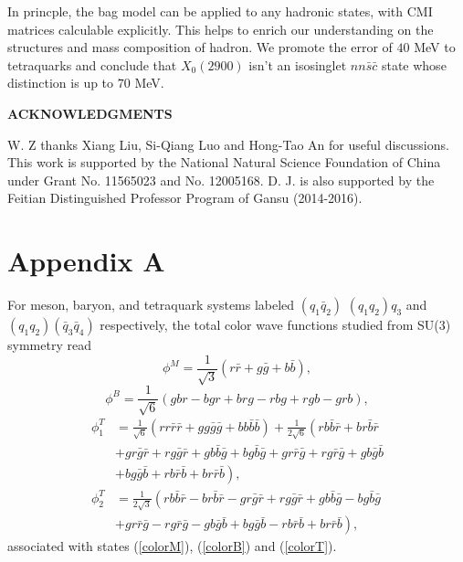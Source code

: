 \documentclass[prd,twocolumn,floatfix,nofootinbib]{revtex4}
\begin{document}
In princple, the bag model can be applied to any hadronic states, with CMI matrices calculable explicitly. This helps to enrich our understanding on the structures and mass composition of hadron. 
We promote the error of $40$ MeV to tetraquarks and conclude that $X_{0}(2900)$ isn't an isosinglet $nn\bar{s}\bar{c}$ state whose distinction is up to $70$ MeV. 


\medskip
\textbf{ACKNOWLEDGMENTS}

W. Z thanks Xiang Liu, Si-Qiang Luo and Hong-Tao An for useful discussions.
This work is supported by the National Natural Science Foundation of China under Grant No. 11565023 and No. 12005168. 
D. J. is also supported by the Feitian Distinguished Professor Program of Gansu (2014-2016).


\medskip
\section*{Appendix A}\label{AppendixA}
\setcounter{equation}{0}
\renewcommand{\theequation}{A\arabic{equation}}
For meson, baryon, and tetraquark systems labeled $(q_{1}\bar{q}_{2})$ $(q_{1}q_{2})q_{3}$ and $(q_{1}q_{2})(\bar{q}_{3}\bar{q}_{4})$ respectively,
the total color wave functions studied from SU(3) symmetry read
\begin{equation}\label{pcolorM}
    \phi^{M}=\frac{1}{\sqrt{3}} \left(r\bar{r}+g\bar{g}+b\bar{b} \right),
\end{equation}
\begin{equation}\label{pcolorB}
    \phi^{B}=\frac{1}{\sqrt{6}} \left(gbr-bgr+brg-rbg+rgb-grb \right),
\end{equation}
\begin{equation}\label{pcolorT}
    \begin{aligned}
        \phi_{1}^{T}&=\frac{1}{\sqrt{6}} \left(rr\bar{r}\bar{r}+gg\bar{g}\bar{g}+bb\bar{b}\bar{b} \right)
        +\frac{1}{2\sqrt{6}} \left(rb\bar{b}\bar{r}+br\bar{b}\bar{r} \right.\\
        &\left. +gr\bar{g}\bar{r}+rg\bar{g}\bar{r}+gb\bar{b}\bar{g}+bg\bar{b}\bar{g}+gr\bar{r}\bar{g}+rg\bar{r}\bar{g}+gb\bar{g}\bar{b} \right.\\
        &\left. +bg\bar{g}\bar{b}+rb\bar{r}\bar{b}+br\bar{r}\bar{b} \right), \\
        \phi_{2}^{T}&=\frac{1}{2\sqrt{3}} \left(rb\bar{b}\bar{r}-br\bar{b}\bar{r}-gr\bar{g}\bar{r}+rg\bar{g}\bar{r}+gb\bar{b}\bar{g}-bg\bar{b}\bar{g} \right.\\
        &\left. +gr\bar{r}\bar{g}-rg\bar{r}\bar{g}-gb\bar{g}\bar{b}+bg\bar{g}\bar{b}-rb\bar{r}\bar{b}+br\bar{r}\bar{b}\right),
    \end{aligned}
\end{equation}
associated with states (\ref{colorM}), (\ref{colorB}) and (\ref{colorT}).
\end{document}
